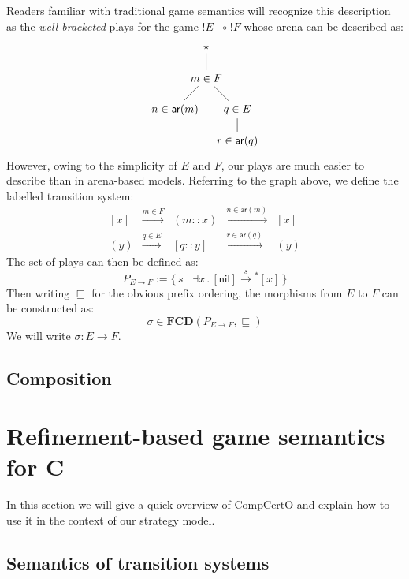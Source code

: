 \documentclass[format=sigplan,authordraft]{acmart}
\newcommand{\kw}[1]{\ensuremath{\mathsf{#1}}}
\begin{document}
Readers familiar with traditional game semantics
will recognize this description
as the \emph{well-bracketed} plays for the game ${!}E \multimap {!}F$
whose arena can be described as:
\[
  \begin{tikzpicture}
    \node (S) at (0,3) {$\star$};
    \node (BQ) at (0,2) {$m \in F$};
    \node (BA) at (-1,1) {$n \in \kw{ar}(m)$};
    \node (AQ) at (+1,1) {$q \in E$};
    \node (AA) at (+1,0) {$r \in \kw{ar}(q)$};
    \path (S) edge (BQ);
    \path (BQ) edge (BA);
    \path (BQ) edge (AQ);
    \path (AQ) edge (AA);
  \end{tikzpicture}
\]
However,
owing to the simplicity of $E$ and $F$,
our plays are much easier to describe
than in arena-based models.
Referring to the graph above,
we define the labelled transition system:
\[
  \begin{array}{rcccl}
    [x] & \xrightarrow{m \in F} & (m :: x)
        & \xrightarrow{n \in \kw{ar}(m)} & [x] \\
    (y) & \xrightarrow{q \in E} & [q :: y]
        & \xrightarrow{r \in \kw{ar}(q)} & (y)
  \end{array}
\]
The set of plays can then be defined as:
\[
  P_{E \rightarrow F} :=
    \{ \, s \mid \exists x \,.\,
       [\kw{nil}] \mathrel{{\xrightarrow{s}}{}^*} [x] \, \}
\]
Then writing $\sqsubseteq$ for the
obvious prefix ordering,
the morphisms from $E$ to $F$
can be constructed as:
\[
    \sigma \in \mathbf{FCD}(P_{E \rightarrow F}, {\sqsubseteq})
\]
We will write $\sigma : E \rightarrow F$.

\subsection{Composition}







\section{Refinement-based game semantics for C} %

In this section we will give a quick overview of CompCertO
and explain how to use it in the context of our strategy model.

\subsection{Semantics of transition systems} %
\end{document}
